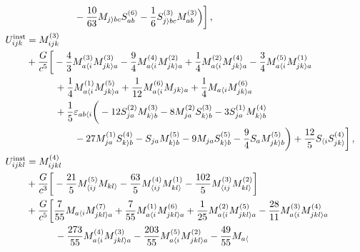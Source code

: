 \documentclass[prd,preprint,superscriptaddress,tightenlines,nofootinbib,
  eqsecnum,showpacs]{revtex4}
\begin{document}
\begin{subequations}
\begin{align}
  \nonumber\\ & \quad\qquad\qquad - \frac{10}{63} M_{j \rangle bc}
  S_{ab}^{(6)} - \frac{1}{6} S_{j \rangle bc}^{(3)} M_{ab}^{(3)} \Big)
  \bigg] \,,\\
U_{ijk}^\text{inst} &= M^{(3)}_{ijk} \nonumber \\ & +{G\over
  c^5}\bigg[-{4\over3}M^{(3)}_{a\langle i}M^{(3)}_{jk\rangle
    a}-{9\over4}M^{(4)}_{a\langle i}M^{(2)}_{jk\rangle a} +
  {1\over4}M^{(2)}_{a\langle i}M^{(4)}_{jk\rangle a} -
  {3\over4}M^{(5)}_{a\langle i}M^{(1)}_{jk\rangle a} \nonumber\\ &
  \quad\qquad +{1\over4}M^{(1)}_{a\langle i}M^{(5)}_{jk\rangle a} +
              {1\over12}M^{(6)}_{a\langle i}M_{jk\rangle a}
              +{1\over4}M_{a\langle i}M^{(6)}_{jk\rangle a}
              \nonumber\\ & \quad\qquad +
                          {1\over5}\varepsilon_{ab\langle i}\bigg(
                          -12S^{(2)}_{ja}M^{(3)}_{k\rangle
                            b}-8M^{(2)}_{ja}S^{(3)}_{k\rangle b}
                          -3S^{(1)}_{ja}M^{(4)}_{k\rangle
                            b}\nonumber\\ & \quad\qquad\qquad
                          -27M^{(1)}_{ja}S^{(4)}_{k\rangle
                            b}-S_{ja}M^{(5)}_{k\rangle
                            b}-9M_{ja}S^{(5)}_{k\rangle b}
                          -{9\over4}S_{a}M^{(5)}_{jk\rangle b}\bigg)
                          +{12\over5}S_{\langle
                            i}S^{(4)}_{jk\rangle}\bigg]\,,\\
U_{ijkl}^\text{inst} &= M^{(4)}_{ijkl} \nonumber \\ &+ {G\over c^3}
\bigg[ -{21\over5}M^{(5)}_{\langle ij}M_{kl\rangle }- {63
    \over5}M^{(4)}_{\langle ij}M^{(1)}_{kl\rangle }-
  {102\over5}M^{(3)}_{\langle ij}M^{(2)}_{kl\rangle }\bigg] \nonumber
\\ &+\frac{G}{c^5} \bigg[ \frac{7}{55} M_{a \langle i} M_{jkl \rangle
    a}^{(7)} + \frac{7}{55} M_{a \langle i}^{(1)} M_{jkl \rangle
    a}^{(6)} + \frac{1}{25} M_{a \langle i}^{(2)} M_{jkl \rangle
    a}^{(5)} - \frac{28}{11} M_{a \langle i}^{(3)} M_{jkl \rangle
    a}^{(4)} \nonumber \\ & \quad\qquad - \frac{273}{55} M_{a \langle
    i}^{(4)} M_{jkl \rangle a}^{(3)} - \frac{203}{55} M_{a \langle
    i}^{(5)} M_{jkl \rangle a}^{(2)} - \frac{49}{55} M_{a \langle
}
\end{align}
\end{subequations}
\end{document}
